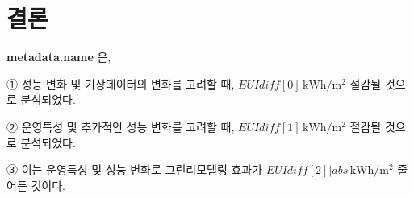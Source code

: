 \documentclass[a4paper,10pt]{article}
\begin{document}
\section{결론}
\begin{tcolorbox}[colback=gray!5,colframe=black!60,boxrule=0.6pt,
                  left=4mm,right=4mm,top=2mm,bottom=2mm]
\textbf{ {{metadata.name}} }은,

① 성능 변화 및 기상데이터의 변화를 고려할 때, \underline{${{EUIdiff[0]}}\,\mathrm{kWh/m^2}$} 절감될 것으로 분석되었다.

② 운영특성 및 추가적인 성능 변화를 고려할 때, 
\underline{${{EUIdiff[1]}}\,\mathrm{kWh/m^2}$} 절감될 것으로 분석되었다. 

③ 이는 운영특성 및 성능 변화로 그린리모델링 효과가 
\underline{${{EUIdiff[2] | abs}}\,\mathrm{kWh/m^2}$} 줄어든 것이다.
\end{tcolorbox}


\newpage
\end{document}
